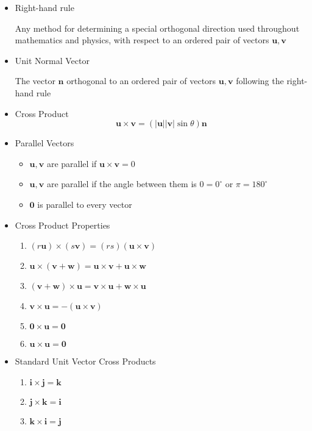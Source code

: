 \documentclass[12pt]{article}
\renewcommand{\vec}[1]{\mathbf{#1}}
\newcommand{\veci}{\mathbf{i}}
\newcommand{\vecj}{\mathbf{j}}
\newcommand{\veck}{\mathbf{k}}
\newcommand{\<}{\left<}
\renewcommand{\>}{\right>}
\begin{document}
    \begin{itemize}
    \item Right-hand rule

      Any method for determining a special orthogonal direction used throughout mathematics and physics, with respect to an ordered pair of vectors $\vec{u},\vec{v}$
      
    \item Unit Normal Vector

      The vector $\vec{n}$ orthogonal to an ordered pair of vectors $\vec{u},\vec{v}$ following the right-hand rule
    
    \item Cross Product
       \[\vec{u} \times \vec{v} = (|\vec{u}||\vec{v}|\sin \theta) \vec{n} \]
    
    \item Parallel Vectors
      \begin{itemize}
      \item  $\vec{u},\vec{v}$ are parallel if $\vec{u} \times \vec{v} = 0$
      \item $\vec{u},\vec{v}$ are parallel if the angle between them is $0=0^\circ$ or $\pi = 180^\circ$
      \item $\vec{0}$ is parallel to every vector
      \end{itemize}
    
    \item Cross Product Properties
    
      \begin{enumerate}
      \item $(r\vec{u}) \times (s\vec{v}) = (rs)(\vec{u} \times \vec{v})$
      \item $\vec{u} \times (\vec{v} + \vec{w}) = \vec{u} \times \vec{v} + \vec{u} \times \vec{w}$
      \item $(\vec{v} + \vec{w}) \times \vec{u} = \vec{v} \times \vec{u} + \vec{w} \times \vec{u}$
      \item $\vec{v} \times \vec{u} = -(\vec{u} \times \vec{v})$
      \item $\vec{0} \times \vec{u} = \vec{0}$
      \item $\vec{u} \times \vec{u} = \vec{0}$
      \end{enumerate}

    \item Standard Unit Vector Cross Products
      \begin{enumerate}
      \item $\veci \times \vecj = \veck$
      \item $\vecj \times \veck = \veci$
      \item $\veck \times \veci = \vecj$
      \end{enumerate}


\end{itemize}
\end{document}
